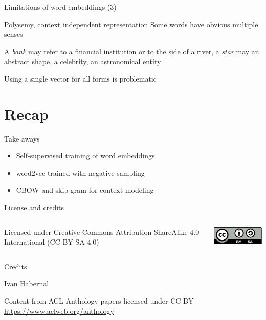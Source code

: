 \documentclass[12pt,aspectratio=169,handout]{beamer}
\begin{document}
\begin{frame}{Limitations of word embeddings (3)}
	
\begin{block}{Polysemy, context independent representation}
Some words have obvious multiple senses

A \emph{bank} may refer to a financial institution or to the side of a river, a \emph{star} may an abstract shape, a celebrity, an astronomical entity

Using a single vector for all forms	is problematic
\end{block}


\end{frame}


\section*{Recap}



\begin{frame}{Take aways}
	
\begin{itemize}
	\item Self-supervised training of word embeddings
	\item word2vec trained with negative sampling
	\item CBOW and skip-gram for context modeling
\end{itemize}
	
\end{frame}



\begin{frame}{License and credits}

	\begin{columns}
		\begin{column}{0.7\textwidth}
			Licensed under Creative Commons Attribution-ShareAlike 4.0 International (CC BY-SA 4.0)
		\end{column}
		\begin{column}{0.2\textwidth}
			\includegraphics[width=0.9\linewidth]{img/cc-by-sa-icon.pdf}
		\end{column}
	\end{columns}
	
	\bigskip
	
	Credits
	
	\begin{scriptsize}
		
		Ivan Habernal
		
		Content from ACL Anthology papers licensed under CC-BY \url{https://www.aclweb.org/anthology}
		
	
	\end{scriptsize}
	
\end{frame}
\end{document}
